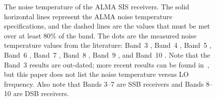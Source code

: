 \lipsum[2-4]

\begin{figure}[!htb]
\centering

\caption[Noise temperature of the ALMA receivers.]{The noise temperature of the ALMA SIS receivers. The solid horizontal lines represent the ALMA noise temperature specifications, and the dashed lines are the values that must be met over at least 80\% of the band. The dots are the measured noise temperature values from the literature:
Band~3 ,
Band~4 , 
Band~5 ,
Band~6 ,
Band~7 ,
Band~8 ,
Band~9 , and
Band~10 . 
Note that the Band~3 results are out-dated; more recent results can be found in~\cite{Kerr2014}, but this paper does not list the noise temperature versus LO frequency. Also note that Bands 3--7 are SSB receivers and Bands 8--10 are DSB receivers.}
\label{fig:alma-tn}
\end{figure}

\lipsum[2-4]